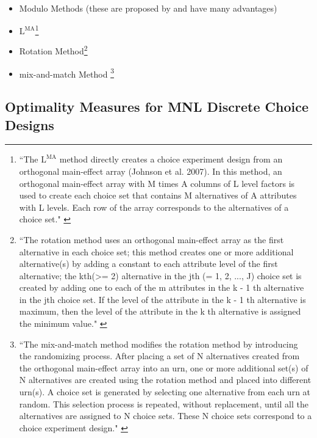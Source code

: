 \documentclass{article}
\begin{document}
\begin{itemize}
    \item Modulo Methods (these are proposed by \citet{street2007construction} and have many advantages)
    \item $\text{L}^{\text{MA}}$\footnote{``The $\text{L}^{\text{MA}}$ method directly creates a choice experiment design from an orthogonal main-effect array (Johnson et al. 2007). In this method, an orthogonal main-effect array with M times A columns of L level factors is used to create each choice set that contains M alternatives of A attributes with L levels. Each row of the array corresponds to the alternatives of a choice set." \citep{support.CEs}}
    \item Rotation Method\footnote{``The rotation method uses an orthogonal main-effect array as the first alternative in each choice set; this method creates one or more additional alternative(s) by adding a constant to each attribute level of the first alternative; the kth(>= 2) alternative in the jth (= 1, 2, ..., J) choice set is created by adding one to each of the m attributes in the k - 1 th alternative in the jth choice set. If the level of the attribute in the k - 1 th alternative is maximum, then the level of the attribute in the k th alternative is assigned the minimum value." \citep{support.CEs}}
    \item mix-and-match Method \footnote{``The mix-and-match method modifies the rotation method by introducing the randomizing process. After placing a set of N alternatives created from the orthogonal main-effect array into an urn, one or more additional set(s) of N alternatives are created using the rotation method and placed into different urn(s). A choice set is generated by selecting one alternative from each urn at random. This selection process is repeated, without replacement, until all the alternatives are assigned to N choice sets. These N choice sets correspond to a choice experiment design." \citet{support.CEs}}
\end{itemize}


\subsection{Optimality Measures for MNL Discrete Choice Designs}
\end{document}
